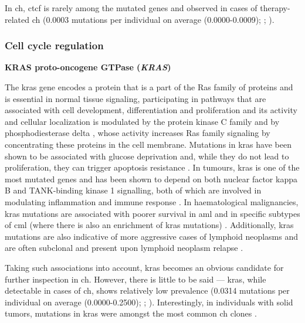 In \ac{ch}, \ac{ctcf} is rarely among the mutated genes and observed in cases of therapy-related \ac{ch} \cite{Jaiswal2014-rl,Bolton2020-ct,Coombs2017-ph} (0.0003 mutations per individual on average (0.0000-0.0009); ; ).

\subsubsection{Cell cycle regulation}

\noindent \textbf{KRAS proto-oncogene GTPase (\textit{KRAS})}

The \ac{kras} gene encodes a protein that is a part of the Ras family of proteins and is essential in normal tissue signaling, participating in pathways that are associated with cell development, differentiation and proliferation \cite{Kranenburg2005-sl} and its activity and cellular localization is modulated by the protein kinase C family \cite{Bivona2006-jq} and by phosphodiesterase delta \cite{Chandra2011-ij}, whose activity increases Ras family signaling by concentrating these proteins in the cell membrane. Mutations in \ac{kras} have been shown to be associated with glucose deprivation and, while they do not lead to proliferation, they can trigger apoptosis resistance \cite{Yun2009-an}. In tumours, \ac{kras} is one of the most mutated genes \cite{Kranenburg2005-sl} and has been shown to depend on both nuclear factor kappa B and TANK-binding kinase 1 signalling, both of which are involved in modulating inflammation and immune response \cite{Meylan2009-nc,Barbie2009-hz}. In haematological malignancies, \ac{kras} mutations are associated with poorer survival in \ac{aml} \cite{Ball2019-cs} and in specific subtypes of \ac{cml} (where there is also an enrichment of \ac{kras} mutations) \cite{Vendramini2019-oh}. Additionally, \ac{kras} mutations are also indicative of more aggressive cases of lymphoid neoplasms \cite{Neri1988-xj} and are often subclonal and present upon lymphoid neoplasm relapse \cite{Oshima2016-vy,Malinowska-Ozdowy2015-bv}.

Taking such associations into account, \ac{kras} becomes an obvious candidate for further inspection in \ac{ch}. However, there is little to be said --- \ac{kras}, while detectable in cases of \ac{ch}, shows relatively low prevalence \cite{Jaiswal2014-rl,Genovese2014-eu,Zink2017-zi,Bolton2020-ct,Coombs2017-ph,McKerrell2015-rl,Acuna-Hidalgo2017-ng,Young2016-du,Young2019-rz} (0.0314 mutations per individual on average (0.0000-0.2500); ; ). Interestingly, in individuals with solid tumors, mutations in \ac{kras} were amongst the most common \ac{ch} clones \cite{Conces2019-yq,Wang2019-pl}.

